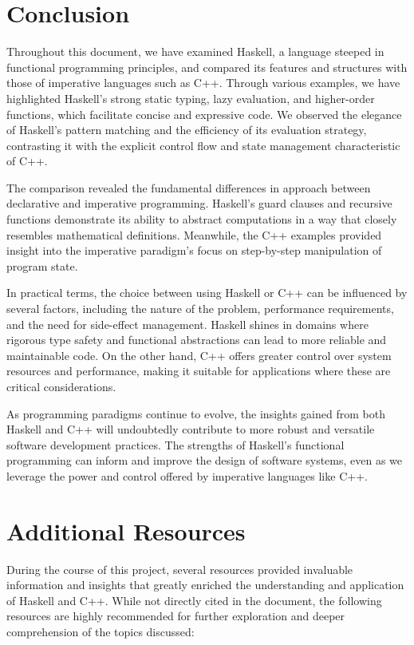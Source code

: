 \documentclass[a4paper, 10pt]{article}
\begin{document}
    \newpage
    \section{Conclusion}
    \noindent Throughout this document, we have examined Haskell, a language steeped in functional programming principles, and compared its features and structures with those of imperative languages such as C++. Through various examples, we have highlighted Haskell's strong static typing, lazy evaluation, and higher-order functions, which facilitate concise and expressive code. We observed the elegance of Haskell's pattern matching and the efficiency of its evaluation strategy, contrasting it with the explicit control flow and state management characteristic of C++.

    \noindent The comparison revealed the fundamental differences in approach between declarative and imperative programming. Haskell's guard clauses and recursive functions demonstrate its ability to abstract computations in a way that closely resembles mathematical definitions. Meanwhile, the C++ examples provided insight into the imperative paradigm's focus on step-by-step manipulation of program state.

    \noindent In practical terms, the choice between using Haskell or C++ can be influenced by several factors, including the nature of the problem, performance requirements, and the need for side-effect management. Haskell shines in domains where rigorous type safety and functional abstractions can lead to more reliable and maintainable code. On the other hand, C++ offers greater control over system resources and performance, making it suitable for applications where these are critical considerations.

    \noindent As programming paradigms continue to evolve, the insights gained from both Haskell and C++ will undoubtedly contribute to more robust and versatile software development practices. The strengths of Haskell's functional programming can inform and improve the design of software systems, even as we leverage the power and control offered by imperative languages like C++.

    \newpage
    \nocite{*}
    \printbibliography[heading=bibnumbered, title={References}]

    \newpage
	\section{Additional Resources}
        During the course of this project, several resources provided invaluable information and insights that greatly enriched the understanding and application of Haskell and C++. While not directly cited in the document, the following resources are highly recommended for further exploration and deeper comprehension of the topics discussed:
\end{document}
